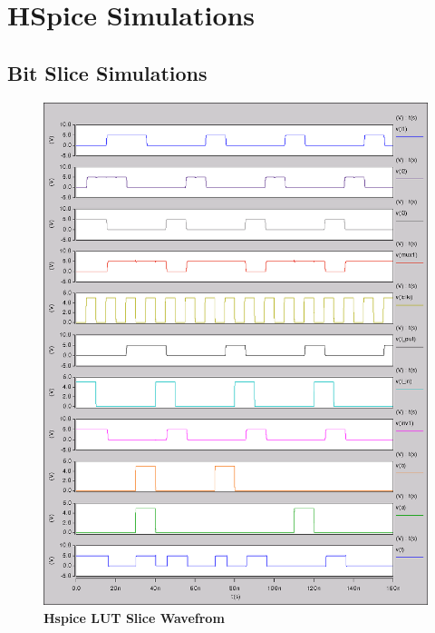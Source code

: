 \documentclass[a4paper]{article}
\begin{document}
\section{\textbf{HSpice Simulations}}
\subsection{\textbf{Bit Slice Simulations}}
    \begin{figure}[H]
        \centering
        \includegraphics[width=\textwidth,height=\textheight,keepaspectratio]{../../cscope/lut_waveforms.png}
        \caption{\textbf{Hspice LUT Slice Wavefrom}}
        \label{fig:gg}
    \end{figure}
\end{document}
